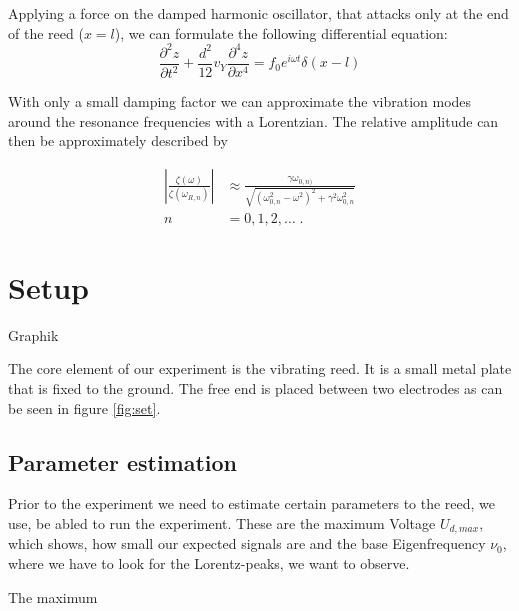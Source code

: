 \documentclass[a4paper,12pt]{article}
\begin{document}
Applying a force on the damped harmonic oscillator, that attacks only at the end of the reed ($x = l$), we can formulate the following differential equation:
\begin{equation}
 \frac{\partial^2z}{\partial t^2} + \frac{d^2}{12} v_Y \frac{\partial^4z}{\partial x^4} = f_0 e^{i\omega t}\delta(x - l)
\end{equation}

With only a small damping factor we can approximate the vibration modes around the resonance frequencies with a Lorentzian.
The relative amplitude can then be approximately described by 

\begin{align}
 \left| \frac{\zeta(\omega)}{\zeta(\omega_{R,n})} \right| &\approx \frac{\gamma \omega_{0,n)}}{\sqrt{(\omega_{0,n}^2 - \omega^2)^2 + \gamma^2\omega_{0,n}^2}} \\
 n &= 0, 1, 2,\dots \; \text{.}
\end{align}






\section{Setup}
\label{sec:set}

{\LARGE Graphik}

The core element of our experiment is the vibrating reed.  It is a small metal plate that is fixed to the ground. The free end is placed between 
two electrodes as can be seen in figure \ref{fig:set}.



\subsection{}

\subsection{Parameter estimation}

Prior to the experiment we need to estimate certain parameters to the reed, we use, be abled to run the experiment. These are the maximum Voltage $U_{d,max}$, which shows, 
how small our expected signals are and the base Eigenfrequency $\nu_0$, where we have to look for the Lorentz-peaks, we want to observe.


The maximum
\end{document}
